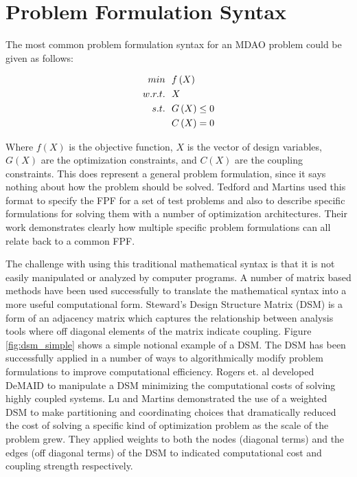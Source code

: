\documentclass[]{aiaa-tc} %
\begin{document}
\section{Problem Formulation Syntax}
    The most common problem formulation syntax for an MDAO problem could be given as follows: 

    \begin{align}
        min &\ \ f\left(X\right) \notag
        \\ w.r.t. &\ \  X \notag
        \\ s.t. &\ \ G\left(X\right) \leq 0
        \\      &\ \ C\left(X\right) = 0
    \end{align}

    Where $f(X)$ is the objective function, $X$ is the vector of design variables, $G(X)$ are the optimization constraints, 
    and $C(X)$ are the coupling constraints. This does represent a general problem formulation, since it says nothing about 
    how the problem should be solved. Tedford and Martins used this format to specify the FPF for a set of test problems and 
    also to describe specific formulations for solving them with a number of optimization architectures\cite{Tedford2009}. Their
    work demonstrates clearly how multiple specific problem formulations can all relate back to a common FPF. 

    The challenge with using this traditional mathematical syntax is that it is not easily manipulated or analyzed by computer programs. 
    A number of matrix based methods have been used successfully to translate the mathematical syntax into a more useful computational form. 
    Steward's Design Structure Matrix (DSM) is a form of an adjacency matrix which captures the relationship between analysis tools where off 
    diagonal elements of the matrix indicate coupling\cite{Steward1981}. Figure \ref{fig:dsm_simple} shows a simple notional example of a DSM. 
    The DSM has been successfully applied in a number of ways to algorithmically modify problem formulations to 
    improve computational efficiency. Rogers et. al developed DeMAID to manipulate a
    DSM  minimizing the computational costs of solving highly coupled systems\cite{Rogers1996}. Lu and Martins demonstrated 
    the use of a weighted DSM to make partitioning and coordinating choices that dramatically reduced the 
    cost of solving a specific kind of optimization problem as the scale of the problem grew. 
    They applied weights to both the nodes (diagonal terms) and the edges (off diagonal terms) of the 
    DSM to indicated computational cost and coupling strength respectively.
\end{document}
